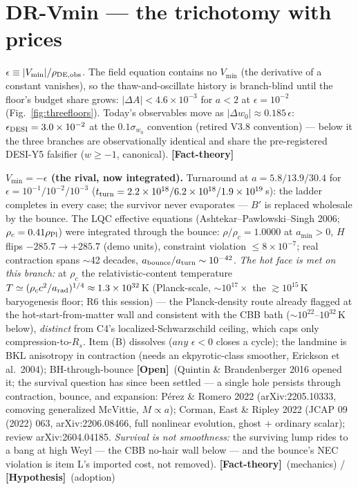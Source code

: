 \documentclass[11pt]{article}
\newcommand{\factth}{\textcolor{green!40!black}{\textbf{[Fact-theory]}}}
\newcommand{\hyp}{\textcolor{orange!80!black}{\textbf{[Hypothesis]}}}
\newcommand{\open}{\textcolor{red!70!black}{\textbf{[Open]}}}
\begin{document}
\section{DR-Vmin --- the trichotomy with prices}
$\epsilon\equiv|V_{\min}|/\rho_{\rm DE,obs}$. The field equation contains no $V_{\min}$ (the derivative of a constant vanishes), so the thaw-and-oscillate history is branch-blind until the floor's budget share grows: $|\Delta A|<4.6\times10^{-3}$ for $a<2$ at $\epsilon=10^{-2}$ (Fig.~\ref{fig:threefloors}). Today's observables move as $|\Delta w_0|\approx0.185\,\epsilon$: \textbf{$\epsilon_{\rm DESI}=3.0\times10^{-2}$} at the $0.1\sigma_{w_0}$ convention (retired V3.8 convention) --- below it the three branches are observationally identical and share the pre-registered DESI-Y5 falsifier ($w\ge-1$, canonical). \factth

\textbf{$V_{\min}=-\epsilon$ (the rival, now integrated).} Turnaround at $a=5.8/13.9/30.4$ for $\epsilon=10^{-1}/10^{-2}/10^{-3}$ ($t_{\rm turn}=2.2\times10^{18}/6.2\times10^{18}/1.9\times10^{19}$\,s): the ladder completes in every case; the survivor never evaporates --- $B'$ is replaced wholesale by the bounce. The LQC effective equations (Ashtekar--Pawlowski--Singh 2006; $\rho_c=0.41\rho_{\rm Pl}$) were integrated through the bounce: $\rho/\rho_c=1.0000$ at $a_{\min}>0$, $H$ flips $-285.7\to+285.7$ (demo units), constraint violation $\le8\times10^{-7}$; real contraction spans $\sim$42 decades, $a_{\rm bounce}/a_{\rm turn}\sim10^{-42}$. \emph{The hot face is met on this branch:} at $\rho_c$ the relativistic-content temperature $T\simeq(\rho_c c^2/a_{\rm rad})^{1/4}\approx1.3\times10^{32}$\,K (Planck-scale, $\sim10^{17}\times$ the $\gtrsim10^{15}$\,K baryogenesis floor; R6 this session) --- the Planck-density route already flagged at the hot-start-from-matter wall and consistent with the CBB bath ($\sim10^{22}$--$10^{32}$\,K below), \emph{distinct} from C4's localized-Schwarzschild ceiling, which caps only compression-to-$R_s$. Item (B) dissolves ($any$ $\epsilon<0$ closes a cycle); the landmine is BKL anisotropy in contraction (needs an ekpyrotic-class smoother, Erickson et al.\ 2004); BH-through-bounce \open\ (Quintin \& Brandenberger 2016 opened it; the survival question has since been settled --- a single hole persists through contraction, bounce, and expansion: P\'erez \& Romero 2022 (arXiv:2205.10333, comoving generalized McVittie, $M\propto a$); Corman, East \& Ripley 2022 (JCAP 09 (2022) 063, arXiv:2206.08466, full nonlinear evolution, ghost $+$ ordinary scalar); review arXiv:2604.04185. \emph{Survival is not smoothness:} the surviving lump rides to a bang at high Weyl --- the CBB no-hair wall below --- and the bounce's NEC violation is item L's imported cost, not removed). \factth\ (mechanics) / \hyp\ (adoption)
\end{document}
